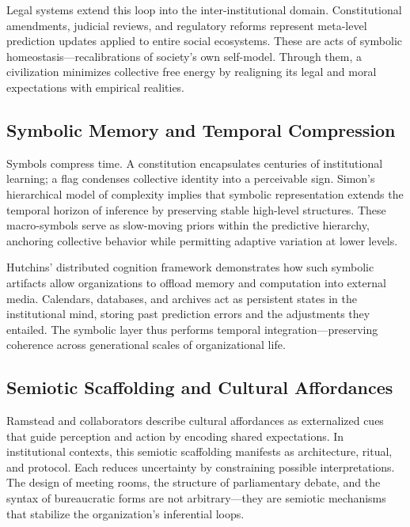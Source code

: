 \documentclass[11pt,a4paper]{article}
\begin{document}
Legal systems extend this loop into the inter-institutional domain.  Constitutional amendments, judicial reviews, and regulatory reforms represent meta-level prediction updates applied to entire social ecosystems.  These are acts of symbolic homeostasis—recalibrations of society’s own self-model.  Through them, a civilization minimizes collective free energy by realigning its legal and moral expectations with empirical realities.

\subsection{Symbolic Memory and Temporal Compression}

Symbols compress time.  A constitution encapsulates centuries of institutional learning; a flag condenses collective identity into a perceivable sign.  Simon’s hierarchical model of complexity \citep{Simon1962ArchitectureComplexity} implies that symbolic representation extends the temporal horizon of inference by preserving stable high-level structures.  These macro-symbols serve as slow-moving priors within the predictive hierarchy, anchoring collective behavior while permitting adaptive variation at lower levels.

Hutchins’ distributed cognition framework \citep{Hutchins1995CognitionInTheWild} demonstrates how such symbolic artifacts allow organizations to offload memory and computation into external media.  Calendars, databases, and archives act as persistent states in the institutional mind, storing past prediction errors and the adjustments they entailed.  The symbolic layer thus performs temporal integration—preserving coherence across generational scales of organizational life.

\subsection{Semiotic Scaffolding and Cultural Affordances}

Ramstead and collaborators \citep{Ramstead2016CulturalAffordances} describe cultural affordances as externalized cues that guide perception and action by encoding shared expectations.  In institutional contexts, this semiotic scaffolding manifests as architecture, ritual, and protocol.  Each reduces uncertainty by constraining possible interpretations.  The design of meeting rooms, the structure of parliamentary debate, and the syntax of bureaucratic forms are not arbitrary—they are semiotic mechanisms that stabilize the organization’s inferential loops.
\end{document}
